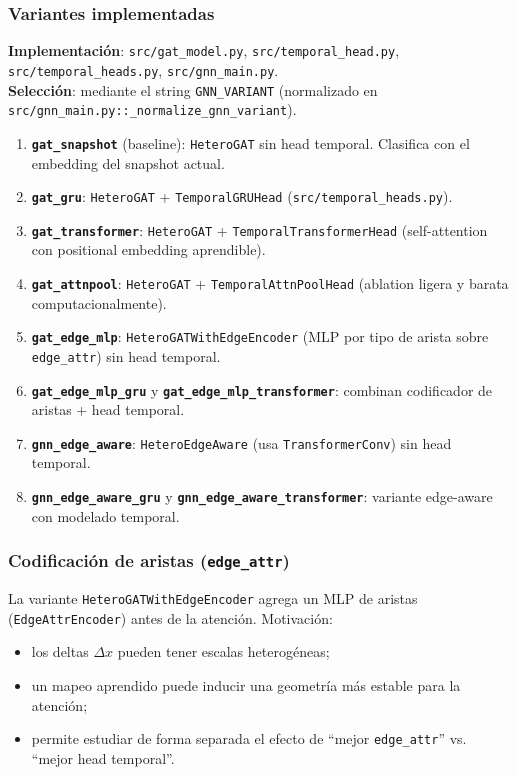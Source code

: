 \subsubsection{Variantes implementadas}
\textbf{Implementaci\'on}: \texttt{src/gat\_model.py}, \texttt{src/temporal\_head.py},
\texttt{src/temporal\_heads.py}, \texttt{src/gnn\_main.py}.\\
\textbf{Selecci\'on}: mediante el string \texttt{GNN\_VARIANT} (normalizado en
\texttt{src/gnn\_main.py::\_normalize\_gnn\_variant}).

\begin{enumerate}[leftmargin=*]
  \item \textbf{\texttt{gat\_snapshot}} (baseline): \texttt{HeteroGAT} sin head temporal. Clasifica con el embedding del snapshot actual.
  \item \textbf{\texttt{gat\_gru}}: \texttt{HeteroGAT} + \texttt{TemporalGRUHead} (\texttt{src/temporal\_heads.py}).
  \item \textbf{\texttt{gat\_transformer}}: \texttt{HeteroGAT} + \texttt{TemporalTransformerHead} (self-attention con positional embedding aprendible).
  \item \textbf{\texttt{gat\_attnpool}}: \texttt{HeteroGAT} + \texttt{TemporalAttnPoolHead} (ablation ligera y barata computacionalmente).
  \item \textbf{\texttt{gat\_edge\_mlp}}: \texttt{HeteroGATWithEdgeEncoder} (MLP por tipo de arista sobre \texttt{edge\_attr}) sin head temporal.
  \item \textbf{\texttt{gat\_edge\_mlp\_gru}} y \textbf{\texttt{gat\_edge\_mlp\_transformer}}: combinan codificador de aristas + head temporal.
  \item \textbf{\texttt{gnn\_edge\_aware}}: \texttt{HeteroEdgeAware} (usa \texttt{TransformerConv}) sin head temporal.
  \item \textbf{\texttt{gnn\_edge\_aware\_gru}} y \textbf{\texttt{gnn\_edge\_aware\_transformer}}: variante edge-aware con modelado temporal.
\end{enumerate}

\subsubsection{Codificaci\'on de aristas (\texttt{edge\_attr})}
La variante \texttt{HeteroGATWithEdgeEncoder} agrega un MLP de aristas
(\texttt{EdgeAttrEncoder}) antes de la atenci\'on. Motivaci\'on:
\begin{itemize}[leftmargin=*]
  \item los deltas \(\Delta x\) pueden tener escalas heterog\'eneas;
  \item un mapeo aprendido puede inducir una geometr\'ia m\'as estable para la atenci\'on;
  \item permite estudiar de forma separada el efecto de ``mejor \texttt{edge\_attr}'' vs. ``mejor head temporal''.
\end{itemize}

